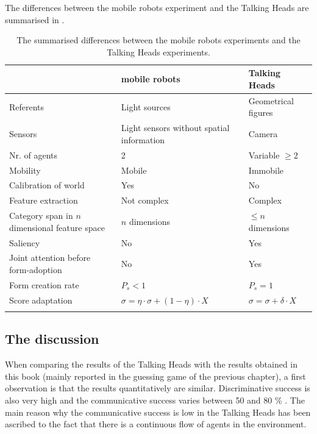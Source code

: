 The differences between the mobile robots experiment and the Talking Heads are summarised in .

\begin{table}
\centering
\begin{tabular}{>{\raggedright}p{4cm}>{\raggedright}p{4cm}l}
\lsptoprule
 & {\sc mobile robots} & {\sc Talking Heads}\\\midrule
 Referents & Light sources & Geometrical figures\\\hline
 Sensors & Light sensors without spatial information & Camera\\\hline
 Nr. of agents & 2 & Variable $\geq 2$\\\hline
 Mobility & Mobile & Immobile\\\hline
 Calibration of world & Yes & No\\\hline
 Feature extraction & Not complex & Complex\\\hline
 Category span in $n$ dimensional feature space & $n$ dimensions & $\leq n$ dimensions\\\hline
 Saliency & No & Yes\\\hline
 Joint attention before form-adoption & No & Yes\\\hline
 Form creation rate & $P_s<1$ & $P_s=1$\\\hline
 Score adaptation & $\sigma = \eta \cdot \sigma + (1-\eta) \cdot X$ & $\sigma = \sigma + \delta \cdot X$\\%
\lspbottomrule
\end{tabular}
\caption{The summarised differences between the mobile robots experiments and the Talking Heads experiments.}
\label{t:disc:differences}
\end{table}


\subsection{The discussion}

When comparing the results of the Talking Heads \citep{steels:2000,kaplan:2000} with the results obtained in this book (mainly reported in the guessing game of the previous chapter), a first observation is that the results quantitatively are similar. Discriminative success is also very high \citep{steels:2000} and the communicative success varies between 50 and 80 \% \citep{kaplan:2000}. The main reason why the communicative success is low in the Talking Heads has been ascribed to the fact that there is a continuous flow of agents in the environment.

